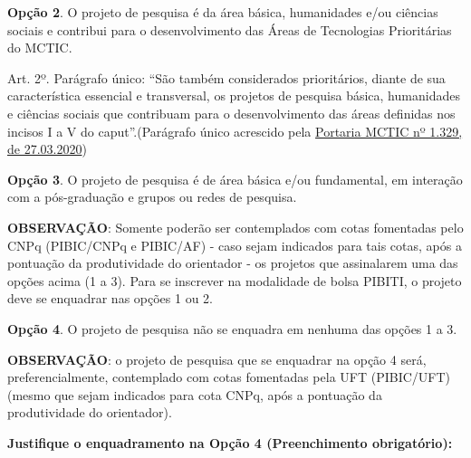 \documentclass[12pt, consuni, professor]{uftpibic}
\newcommand{\ko}{\makebox[0pt][l]{(\ \ \ )}\raisebox{.15ex}{\hspace{0.1em}$\qquad$}}
\theoremstyle{plain}
\begin{document}
\ko \textbf{Opção 2}. O projeto de pesquisa é da área básica, humanidades e/ou ciências sociais e contribui para o desenvolvimento das Áreas de Tecnologias Prioritárias do MCTIC.


Art. 2º. Parágrafo único: ``São também considerados prioritários, diante de sua característica essencial e transversal, os projetos de pesquisa básica, humanidades e ciências sociais que contribuam para o desenvolvimento das áreas definidas nos incisos I a V do caput''.(Parágrafo único acrescido pela \href{http://www.in.gov.br/en/web/dou/-/portaria-n-1.329-de-27-de-marco-de-2020-250263672}{Portaria MCTIC nº 1.329, de 27.03.2020})

\bigbreak

\ko \textbf{Opção 3}. O projeto de pesquisa é de área básica e/ou fundamental, em interação com a pós-graduação e grupos ou redes de pesquisa.

\bigbreak

\textbf{OBSERVAÇÃO}: Somente poderão ser contemplados com cotas fomentadas pelo CNPq (PIBIC/CNPq e PIBIC/AF) - caso sejam indicados para tais cotas, após a pontuação da produtividade do orientador - os projetos que assinalarem uma das opções acima (1 a 3). Para se inscrever na modalidade de bolsa PIBITI, o projeto deve se enquadrar nas opções 1 ou 2.

\bigbreak

\ko \textbf{Opção 4}. O projeto de pesquisa não se enquadra em nenhuma das opções 1 a 3.

\bigbreak

\textbf{OBSERVAÇÃO}: o projeto de pesquisa que se enquadrar na opção 4 será, preferencialmente, contemplado com cotas fomentadas pela UFT (PIBIC/UFT) (mesmo que sejam indicados para cota CNPq, após a pontuação da produtividade do orientador).
\bigbreak

\textbf{Justifique o enquadramento na Opção 4 (Preenchimento obrigatório):} 

\noindent\makebox[\linewidth]{\rule{\textwidth}{.5pt}}

\noindent\makebox[\linewidth]{\rule{\textwidth}{.5pt}}

\noindent\makebox[\linewidth]{\rule{\textwidth}{.5pt}}

\noindent\makebox[\linewidth]{\rule{\textwidth}{.5pt}}

\noindent\makebox[\linewidth]{\rule{\textwidth}{.5pt}}

\vspace{2cm}
\setlength{\parindent}{1.5cm}
\end{document}
